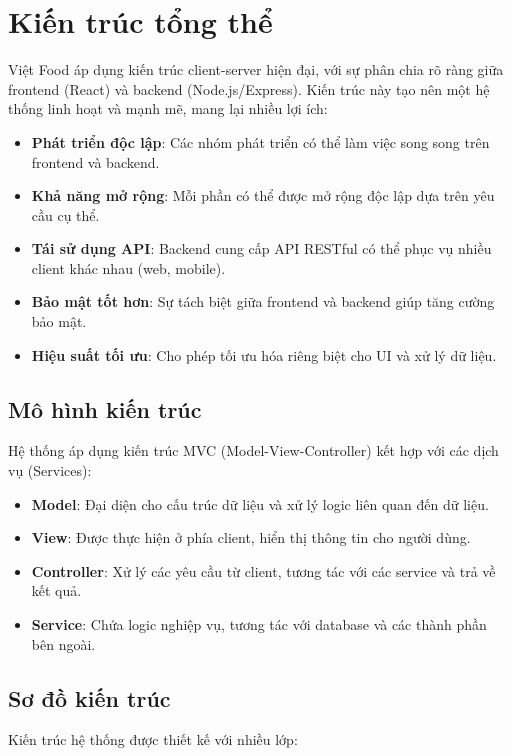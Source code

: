 \section{Kiến trúc tổng thể}

Việt Food áp dụng kiến trúc client-server hiện đại, với sự phân chia rõ ràng giữa frontend (React) và backend (Node.js/Express). Kiến trúc này tạo nên một hệ thống linh hoạt và mạnh mẽ, mang lại nhiều lợi ích:

\begin{itemize}
    \item \textbf{Phát triển độc lập}: Các nhóm phát triển có thể làm việc song song trên frontend và backend.
    \item \textbf{Khả năng mở rộng}: Mỗi phần có thể được mở rộng độc lập dựa trên yêu cầu cụ thể.
    \item \textbf{Tái sử dụng API}: Backend cung cấp API RESTful có thể phục vụ nhiều client khác nhau (web, mobile).
    \item \textbf{Bảo mật tốt hơn}: Sự tách biệt giữa frontend và backend giúp tăng cường bảo mật.
    \item \textbf{Hiệu suất tối ưu}: Cho phép tối ưu hóa riêng biệt cho UI và xử lý dữ liệu.
\end{itemize}

\subsection{Mô hình kiến trúc}
Hệ thống áp dụng kiến trúc MVC (Model-View-Controller) kết hợp với các dịch vụ (Services):

\begin{itemize}
    \item \textbf{Model}: Đại diện cho cấu trúc dữ liệu và xử lý logic liên quan đến dữ liệu.
    \item \textbf{View}: Được thực hiện ở phía client, hiển thị thông tin cho người dùng.
    \item \textbf{Controller}: Xử lý các yêu cầu từ client, tương tác với các service và trả về kết quả.
    \item \textbf{Service}: Chứa logic nghiệp vụ, tương tác với database và các thành phần bên ngoài.
\end{itemize}

\subsection{Sơ đồ kiến trúc}
Kiến trúc hệ thống được thiết kế với nhiều lớp:

